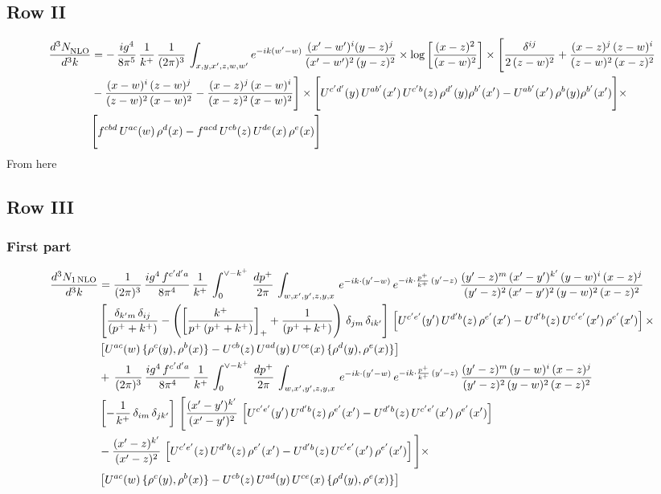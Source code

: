 \documentclass[9pt]{article}
\numberwithin{equation}{section}
\begin{document}
\subsection{Row II}
\begin{align}
     \frac{d^{3}N_{\rm NLO}^{\rm}}{d^{3}k}  & =    
 -\,\frac{ig^{4}}{8\pi^{5}}\,\frac{1}{k^{+}}\,\frac{1}{(2\pi)^{3}}\, \int_{x,y,x',z,w,w^{\prime}} e^{-ik(w^{\prime}-w)}\,\frac{(x'-w')^{i}(y-z)^{j}}{(x'-w')^{2}\,(y-z)^{2}}\times \log{\left[\frac{(x-z)^{2}}{(x-w)^{2}}\right]}\times \Bigg[\frac{\delta^{ij}}{2\,(z-w)^{2}}+\frac{(x-z)^{j}\,(z-w)^{i}}{(z-w)^{2}\,(x-z)^{2}}\notag \\ & -\frac{(x-w)^{i}\,(z-w)^{j}}{(z-w)^{2}\,(x-w)^{2}}-\frac{(x-z)^{j}\,(x-w)^{i}}{(x-z)^{2}\,(x-w)^{2}}\Bigg]\times \Bigg[U^{c'd'}(y)\,U^{ab'}(x')\,U^{c'b}(z)\,\rho^{d'}(y)\rho^{b'}(x')-U^{ab'}(x')\,\rho^{b}(y)\rho^{b'}(x')\Bigg]\times\notag \\ & \Bigg[f^{cbd}\,U^{ac}(w)\,\rho^{d}(x)-f^{acd}\, U^{cb}(z)\,U^{de}(x)\,\rho^{e}(x)\Bigg]
\end{align}
{\color{red}From here}
 \subsection{Row III}
\subsubsection{First part}
\begin{align}
     \frac{d^{3}N_{1\,\rm NLO}}{d^{3}k} & =  \frac{1}{(2\pi)^{3}}\, \frac{ig^{4}\,f^{c'd'a}}{8\pi^{4}}\, \frac{1}{k^{+}}\,\int_{0}^{\vee-k^{+}}\,  \frac{dp^{+}}{2\pi}\, \int_{w,x',y',z,y,x}\, e^{-ik\cdot (y'-w)}\, e^{-ik\cdot \frac{p^{+}}{k^{+}}\,(y'-z)}\,\frac{(y'-z)^{m}\,(x'-y')^{k'}\,(y-w)^{i}\,(x-z)^{j}}{(y'-z)^{2}\,(x'-y')^{2}\,(y-w)^{2}\,(x-z)^{2}}\notag \\ & \left[\frac{\delta_{k'm}\,\delta_{ij}}{(p^{+}+k^{+})}-\left(\left[\frac{k^{+}}{p^{+}\,(p^{+}+k^{+})}\right]_{+}+\frac{1}{(p^{+}+k^{+})}\right)\,\delta_{jm}\,\delta_{ik'}\right]\, \left[U^{c'e'}(y')\,U^{d'b}(z)\,\rho^{e'}(x')-U^{d'b}(z)\,U^{c'e'}(x')\,\rho^{e'}(x')\right]\times\notag \\ &  \left[U^{ac}(w)\, \{\rho^{c}(y),\rho^{b}(x)\}-U^{cb}(z)\,U^{ad}(y)\,U^{ce}(x)\,\{\rho^{d}(y),\rho^{e}(x)\}\right] \notag \\
&  +\,\frac{1}{(2\pi)^{3}}\, \frac{ig^{4}\,f^{c'd'a}}{8\pi^{4}}\, \frac{1}{k^{+}}\,\int_{0}^{\vee-k^{+}}\,  \frac{dp^{+}}{2\pi}\, \int_{w,x',y',z,y,x}\, e^{-ik\cdot (y'-w)}\, e^{-ik\cdot \frac{p^{+}}{k^{+}}\,(y'-z)}\,\frac{(y'-z)^{m}\,(y-w)^{i}\,(x-z)^{j}}{(y'-z)^{2}\,(y-w)^{2}\,(x-z)^{2}}\notag \\ &   \left[-\frac{1}{k^{+}}\, \delta_{im}\, \delta_{jk'}\right]\, \Bigg[\frac{(x'-y')^{k'}}{(x'-y')^{2}}\,\left[U^{c'e'}(y')\,U^{d'b}(z)\,\rho^{e'}(x')-U^{d'b}(z)\,U^{c'e'}(x')\,\rho^{e'}(x')\right]\notag \\ & -\frac{(x'-z)^{k'}}{(x'-z)^{2}}\,\left[U^{c'e'}(z)\,U^{d'b}(z)\,\rho^{e'}(x')-U^{d'b}(z)\,U^{c'e'}(x')\,\rho^{e'}(x')\right]\Bigg]\times\notag \\ &   \left[U^{ac}(w)\, \{\rho^{c}(y),\rho^{b}(x)\}-U^{cb}(z)\,U^{ad}(y)\,U^{ce}(x)\,\{\rho^{d}(y),\rho^{e}(x)\}\right]
\end{align}
\end{document}
